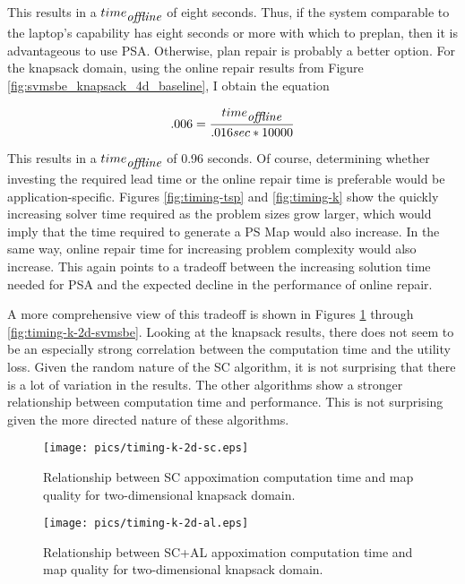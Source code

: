 This results in a $time_{\mbox{\itshape offline}}$ of eight seconds.  Thus, if the system comparable to the laptop's capability has eight seconds or more with which to preplan, then it is advantageous to use PSA.  Otherwise, plan repair is probably a better option.  For the knapsack domain, using the online repair results from Figure \ref{fig:svmsbe_knapsack_4d_baseline}, I obtain the equation

\begin{equation*}
.006 = \frac{time_{\mbox{\itshape offline}}}{.016sec * 10000}
\end{equation*}

This results in a $time_{\mbox{\itshape offline}}$ of 0.96 seconds.  Of course, determining whether investing the required lead time or the online repair time is preferable would be application-specific.  Figures \ref{fig:timing-tsp} and \ref{fig:timing-k} show the quickly increasing solver time required as the problem sizes grow larger, which would imply that the time required to generate a PS Map would also increase.  In the same way, online repair time for increasing problem complexity would also increase.  This again points to a tradeoff between the increasing solution time needed for PSA and the expected decline in the performance of online repair.

A more comprehensive view of this tradeoff is shown in Figures \ref{fig:timing-k-2d-sc} through \ref{fig:timing-k-2d-svmsbe}.  Looking at the knapsack results, there does not seem to be an especially strong correlation between the computation time and the utility loss.  Given the random nature of the SC algorithm, it is not surprising that there is a lot of variation in the results.  The other algorithms show a stronger relationship between computation time and performance.  This is not surprising given the more directed nature of these algorithms.  






\begin{figure}
\begin{center}
\texttt{[image: pics/timing-k-2d-sc.eps]}
\caption{Relationship between SC appoximation computation time and map quality for two-dimensional knapsack domain.}
\label{fig:timing-k-2d-sc}
\end{center}
\end{figure}


\begin{figure}
\begin{center}
\texttt{[image: pics/timing-k-2d-al.eps]}
\caption{Relationship between SC+AL appoximation computation time and map quality for two-dimensional knapsack domain.}
\label{fig:timing-k-2d-al}
\end{center}
\end{figure}

